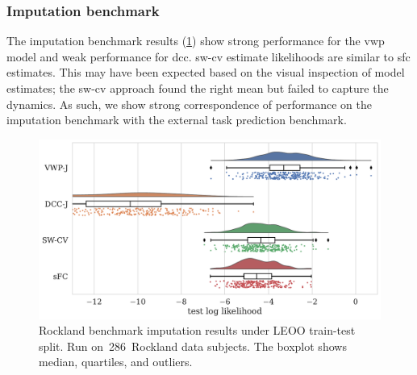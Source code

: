 \subsubsection{Imputation benchmark}

The imputation benchmark results (\cref{fig:rockland-results-imputation-benchmark}) show strong performance for the \gls{vwp} model and weak performance for \gls{dcc}.
\gls{sw-cv} estimate likelihoods are similar to \gls{sfc} estimates.
This may have been expected based on the visual inspection of model estimates; the \gls{sw-cv} approach found the right mean but failed to capture the dynamics.
%
As such, we show strong correspondence of performance on the imputation benchmark with the external task prediction benchmark.


\begin{figure}[ht]
  \centering
  \includegraphics[width=\textwidth]{fig/rockland/CHECKERBOARD645/imputation_study/LEOO_test_log_likelihoods_raincloud}
  \caption{
    Rockland benchmark imputation results under LEOO train-test split.
    Run on~286~Rockland data subjects.
    The boxplot shows median, quartiles, and outliers.
  }\label{fig:rockland-results-imputation-benchmark}
\end{figure}
